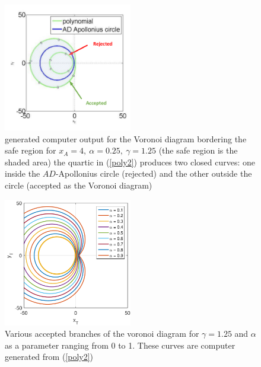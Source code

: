 \documentclass{beamer}
\begin{document}
\begin{frame}
\begin{figure}[htb]
\centering
\includegraphics[width=0.5\textwidth]{fig/g_1p25.pdf}
\caption{generated computer output for the Voronoi diagram bordering the safe region for $x_A=4,\ \alpha=0.25,\ \gamma=1.25$ (the safe region is the shaded area) the quartic in (\ref{poly2}) produces two closed curves: one inside the $AD$-Apollonius circle (rejected) and the other outside the circle (accepted as the Voronoi diagram)}
\label{gamma=1.25}
\end{figure}
\end{frame}
\begin{frame}
\begin{figure}[htb]
\centering
\includegraphics[width=0.5\textwidth]{fig/VAR_alpha_g_1p25.pdf}
\caption{Various accepted branches of the voronoi diagram for $\gamma=1.25$ and $\alpha$ as a parameter ranging from 0 to 1. These curves are computer generated from (\ref{poly2})}
\label{VAR_alpha_gamma=1.25}
\end{figure}
\end{frame}
\end{document}
